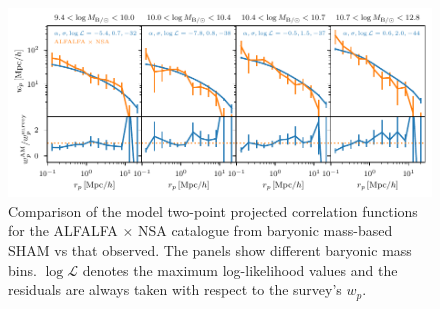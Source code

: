 \documentclass[usenatbib,useAMS]{mnras}
\newcommand{\matched}{ALFALFA $\times$ NSA }
\begin{document}
\begin{figure}
    \centering
    \includegraphics[width=1.0\textwidth]{Figures/matched_BMF_fits.pdf}
    \caption{Comparison of the model two-point projected correlation functions for the \matched catalogue from baryonic mass-based \ac{SHAM} vs that observed. The panels show different baryonic mass bins. $\log\mathcal{L}$ denotes the maximum log-likelihood values and the residuals are always taken with respect to the survey's $w_p$.}
    \label{fig:BMF_fits}
\end{figure}
\end{document}
